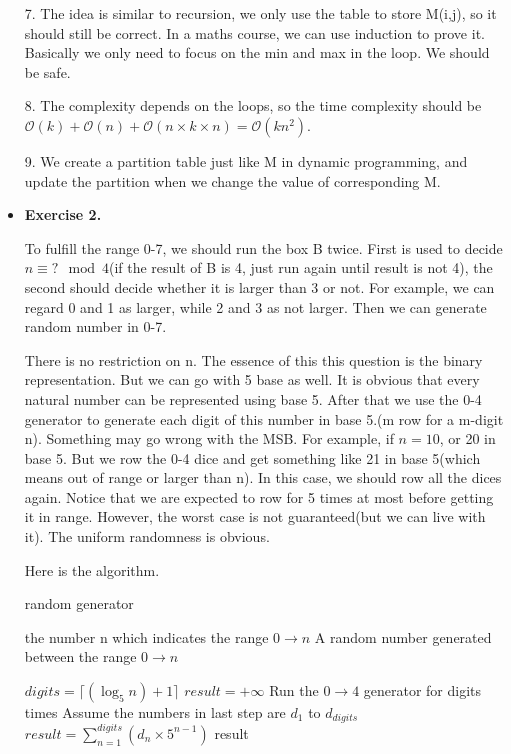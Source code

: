\documentclass{article}
\newcommand{\bigO}{\mathcal{O}}
\begin{document}
\begin{itemize}
7. The idea is similar to recursion, we only use the table to store M(i,j), so it should still be correct. In a maths course, we can use induction to prove it. Basically we only need to focus on the min and max in the loop. We should be safe.

8. The complexity depends on the loops, so the time complexity should be $\bigO(k) + \bigO(n) + \bigO(n\times k\times n) = \bigO(kn^2)$.

9. We create a partition table just like M in dynamic programming, and update the partition when we change the value of corresponding M.

\item \textbf{Exercise 2.}

To fulfill the range 0-7, we should run the box B twice. First is used to decide $n\equiv ? \mod 4$(if the result of B is 4, just run again until result is not 4), the second should decide whether it is larger than 3 or not. For example, we can regard 0 and 1 as larger, while 2 and 3 as not larger. Then we can generate random number in 0-7.

There is no restriction on n. The essence of this this question is the binary representation. But we can go with 5 base as well. It is obvious that every natural number can be represented using base 5. After that we use the 0-4 generator to generate each digit of this number in base 5.(m row for a m-digit n). Something may go wrong with the MSB. For example, if $n = 10$, or 20 in base 5. But we row the 0-4 dice and get something like 21 in base 5(which means out of range or larger than n). In this case, we should row all the dices again. Notice that we are expected to row for 5 times at most before getting it in range. However, the worst case is not guaranteed(but we can live with it). The uniform randomness is obvious.

Here is the algorithm.

\begin{algorithm}[H]  
    \caption{random generator}  
    \begin{algorithmic}[1]  
        \Require the number n which indicates the range $0\to n$
        \Ensure A random number generated between the range $0\to n$

        \State $digits = \lceil (\log_5 n) + 1 \rceil$
        \State $result = +\infty $ 
            \State Run the $0\to 4$ generator for digits times
            \State Assume the numbers in last step are $d_1$ to $d_{digits}$
            \State  $result = \sum_{n=1}^{digits} (d_n \times 5^{n-1})$
        \EndWhile
        \State \Return result
    \end{algorithmic}  
\end{algorithm}


\end{itemize}
\end{document}
